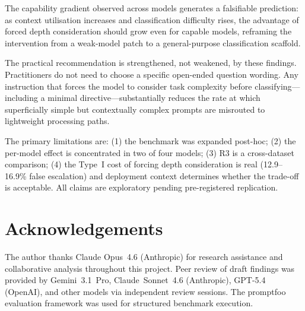 \documentclass[11pt,a4paper]{article}
\begin{document}
The capability gradient observed across models generates a falsifiable
prediction: as context utilisation increases and classification difficulty
rises, the advantage of forced depth consideration should grow even for
capable models, reframing the intervention from a weak-model patch to a
general-purpose classification scaffold.

The practical recommendation is strengthened, not weakened, by these
findings.  Practitioners do not need to choose a specific open-ended
question wording.  Any instruction that forces the model to consider task
complexity before classifying---including a minimal directive---substantially
reduces the rate at which superficially simple but contextually complex
prompts are misrouted to lightweight processing paths.

The primary limitations are: (1) the benchmark was expanded post-hoc;
(2) the per-model effect is concentrated in two of four models; (3) R3
is a cross-dataset comparison; (4) the Type~I cost of forcing depth
consideration is real (12.9--16.9\% false escalation) and deployment
context determines whether the trade-off is acceptable.  All claims are
exploratory pending pre-registered replication.

\section*{Acknowledgements}

The author thanks Claude Opus~4.6 (Anthropic) for research assistance and
collaborative analysis throughout this project.  Peer review of draft
findings was provided by Gemini~3.1~Pro, Claude~Sonnet~4.6 (Anthropic),
GPT-5.4 (OpenAI), and other models via independent review sessions.  The
promptfoo evaluation framework \citep{promptfoo} was used for structured
benchmark execution.
\end{document}
